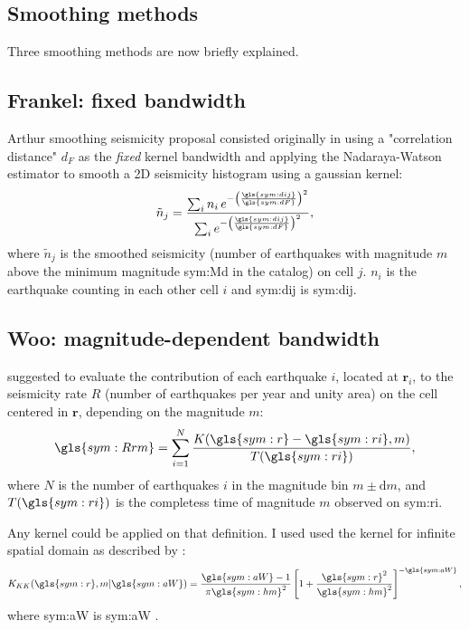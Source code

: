 \documentclass[draft, grl]{agutex}
\begin{document}
\begin{article}
\section{Smoothing methods}
Three smoothing methods are now briefly explained.

\subsection{Frankel: fixed bandwidth}

Arthur \citet{frankel_1995} smoothing seismicity proposal consisted originally in using a "correlation distance" $d_F$ as the \textit{fixed} kernel bandwidth and applying the Nadaraya-Watson \citep{nadaraya_1964, watson_1964} estimator to smooth a 2D seismicity histogram using a gaussian kernel:
\begin{equation}
	\ensuremath{
		\tilde{n}_j = \frac{ \sum_{i} n_i \,e^{ - \left(\frac{\gls{sym:dij}}{\gls{sym:dF}}\right)^2}}
						   { \sum_{i}     e^{ - \left(\frac{\gls{sym:dij}}{\gls{sym:dF}}\right)^2}},
	}
	\label{eq:ni}
\end{equation}
where $\tilde{n}_j$ is the smoothed seismicity (number of earthquakes with magnitude $m$ above the minimum magnitude \gls{sym:Md} in the catalog) on cell $j$. $n_i$ is the earthquake counting in each other cell $i$ and \gls{sym:dij} is \glsdesc{sym:dij}.



\subsection{Woo: magnitude-dependent bandwidth}

\citet{woo_1996} suggested to evaluate the contribution of each earthquake $i$, located at $\boldsymbol{r}_i$, to the seismicity rate $R$ (number of earthquakes per year and unity area) on the cell centered in $\boldsymbol{r}$, depending on the magnitude $m$:
\begin{equation}
	\ensuremath{
		\gls{sym:Rrm} = \sum_{i=1}^{N} \frac{ K(\gls{sym:r} - \gls{sym:ri}, m)}
											{T({\gls{sym:ri})}},
	}
	\label{eq:Rrm}
\end{equation}
where $N$ is the number of earthquakes $i$ in the magnitude bin $m \pm \mathrm{d}m$,
and $T(\gls{sym:ri})$ is the completess time of magnitude $m$ observed on \gls{sym:ri}.


Any kernel could be applied on that definition. I used used the \citet{kagan_knopoff_1980} kernel for infinite spatial domain as described by \citet{woo_1996}:
\begin{equation}
	\ensuremath{
		K_{KK}(\gls{sym:r}, m \arrowvert \gls{sym:aW}) =  \frac{  \gls{sym:aW}  -1}{\pi\gls{sym:hm}^2}
							\left[ 1 + \frac{\gls{sym:r}^2}{\gls{sym:hm}^2} \right]^{-\gls{sym:aW}},
	}
	\label{eq:k_kj}
\end{equation}
where \gls{sym:aW} is \glsdesc{sym:aW} \citep{verejones_1992}.



\end{article}
\end{document}
